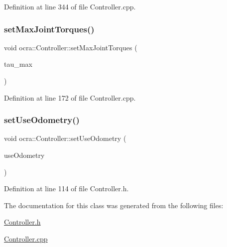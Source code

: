 Definition at line 344 of file Controller.\+cpp.

\hypertarget{classocra_1_1Controller_a646510edd30c0fb5bc29e49917c32356}{}\label{classocra_1_1Controller_a646510edd30c0fb5bc29e49917c32356} 
\subsubsection{\texorpdfstring{set\+Max\+Joint\+Torques()}{setMaxJointTorques()}}
{\footnotesize\ttfamily void ocra\+::\+Controller\+::set\+Max\+Joint\+Torques (\begin{DoxyParamCaption}\item[{const Eigen\+::\+Vector\+Xd \&}]{tau\+\_\+max }\end{DoxyParamCaption})}



Definition at line 172 of file Controller.\+cpp.

\hypertarget{classocra_1_1Controller_a3f6a080793612b0b66e1ce7a26897646}{}\label{classocra_1_1Controller_a3f6a080793612b0b66e1ce7a26897646} 
\subsubsection{\texorpdfstring{set\+Use\+Odometry()}{setUseOdometry()}}
{\footnotesize\ttfamily void ocra\+::\+Controller\+::set\+Use\+Odometry (\begin{DoxyParamCaption}\item[{bool}]{use\+Odometry }\end{DoxyParamCaption})\hspace{0.3cm}{\ttfamily [inline]}}



Definition at line 114 of file Controller.\+h.



The documentation for this class was generated from the following files\+:\begin{DoxyCompactItemize}
\item 
\hyperlink{Controller_8h}{Controller.\+h}\item 
\hyperlink{Controller_8cpp}{Controller.\+cpp}\end{DoxyCompactItemize}
